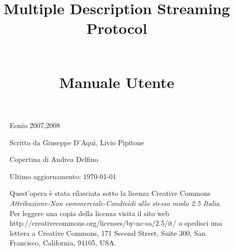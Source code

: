 \documentclass[a4paper,10pt]{book}
\title{\begin{Huge}Multiple Description Streaming Protocol\end{Huge}\\Manuale Utente}
\author{}
\begin{document}
\frontmatter
\maketitle

\begin{figure}[b]
\vspace*{150pt}
{\small Eonio 2007,2008}
\vspace*{13pt}

{\small Scritto da Giuseppe D'Aqu\`i, Livio Pipitone}
\vspace*{13pt}


{\small Copertina di Andrea Delfino}
\vspace*{13pt}

{\footnotesize Ultimo aggiornamento: \today}
\vspace*{13pt}


{\small Quest'opera \`e stata rilasciata sotto la licenza Creative Commons \textit{Attribuzione-Non commerciale-Condividi allo stesso modo 2.5 Italia}. Per leggere una copia della
licenza visita il sito web http://creativecommons.org/licenses/by-nc-sa/2.5/it/ o spedisci una lettera a Creative Commons, 171 Second Street, Suite 300, San Francisco, California, 94105, USA.}
\end{figure}

\tableofcontents


\mainmatter





\appendix

\end{document}

